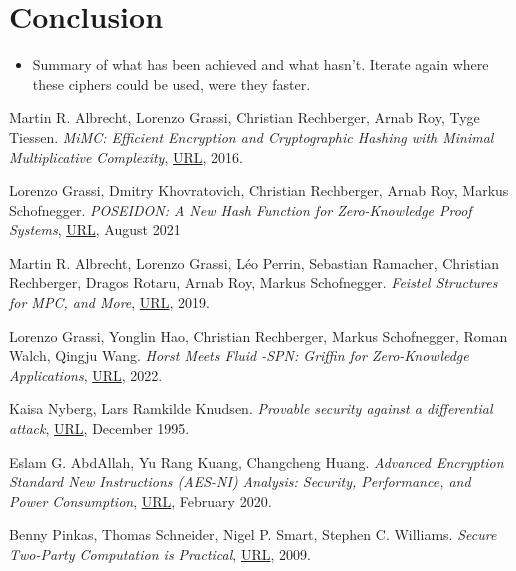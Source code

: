 \documentclass{Resources/UoBLab1}
\theoremstyle{definition}
\begin{document}
\section{Conclusion}
\begin{itemize}
    \item Summary of what has been achieved and what hasn't. Iterate again where these ciphers could be used, were they faster.
\end{itemize}


\setlength{\labelsep}{10pt} %
\begin{thebibliography}{10}
 Martin R. Albrecht, Lorenzo Grassi, Christian Rechberger, Arnab Roy, Tyge Tiessen. \textit{MiMC: Efficient Encryption and Cryptographic Hashing with Minimal Multiplicative Complexity}, \href{https://eprint.iacr.org/2016/492.pdf}{URL}, 2016.

 Lorenzo Grassi, Dmitry Khovratovich, Christian Rechberger, Arnab Roy, Markus Schofnegger. \textit{POSEIDON: A New Hash Function for Zero-Knowledge Proof Systems}, \href{https://www.usenix.org/system/files/sec21-grassi.pdf}{URL}, August 2021

 Martin R. Albrecht, Lorenzo Grassi, Léo Perrin, Sebastian Ramacher, Christian Rechberger, Dragos Rotaru, Arnab Roy, Markus Schofnegger. \textit{Feistel Structures for MPC, and More}, \href{https://eprint.iacr.org/2019/397.pdf}{URL}, 2019.

 Lorenzo Grassi, Yonglin Hao, Christian Rechberger, Markus Schofnegger, Roman Walch, Qingju Wang. \textit{Horst Meets Fluid -SPN: Griffin for Zero-Knowledge Applications}, \href{https://eprint.iacr.org/2022/403.pdf}{URL}, 2022.

 Kaisa Nyberg, Lars Ramkilde Knudsen. \textit{Provable security against a differential attack}, \href{https://link.springer.com/article/10.1007/BF00204800}{URL}, December 1995.

 Eslam G. AbdAllah, Yu Rang Kuang, Changcheng Huang. \textit{Advanced Encryption Standard New Instructions (AES-NI) Analysis: Security, Performance, and Power Consumption}, \href{https://www.sce.carleton.ca/faculty/huang/iccae-2020.pdf}{URL}, February 2020.

 Benny Pinkas, Thomas Schneider, Nigel P. Smart, Stephen C. Williams. \textit{Secure Two-Party Computation is Practical}, \href{https://eprint.iacr.org/2009/314.pdf}{URL}, 2009.


\end{thebibliography}
\end{document}
